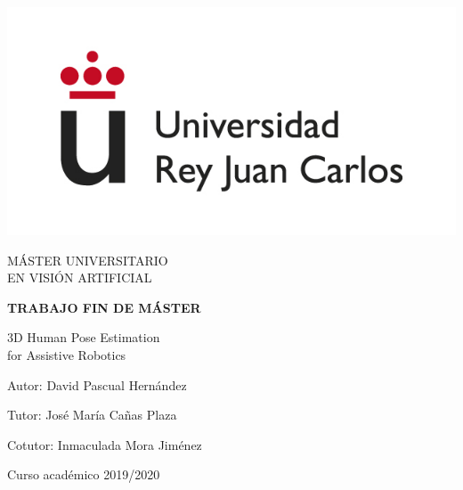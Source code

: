 \begin{titlepage}
	
	\begin{center}
		\vspace*{7.7mm}
		\begin{center}
			\includegraphics[width=0.4\linewidth]{figures/logo.jpg}
		\end{center}
		\vspace{6.5mm}
		
		\fontsize{14}{14}\selectfont MÁSTER UNIVERSITARIO \\ EN VISIÓN ARTIFICIAL

		\vspace{70pt}
		
		\fontsize{15.7}{14}\selectfont \textbf{TRABAJO FIN DE MÁSTER} 
		
		\vspace{25mm}
		\begin{huge}
			 3D Human Pose Estimation \\ for Assistive Robotics
		\end{huge}
		
		\vspace{25mm}
		
		\begin{large}
			Autor: David Pascual Hernández
			
			Tutor: José María Cañas Plaza
			
			Cotutor: Inmaculada Mora Jiménez 
			
			\vspace{10mm}
		\end{large}
		\begin{normalsize}
			Curso académico 2019/2020
		\end{normalsize}
		\vspace{10mm}
		
	\end{center}
	
\end{titlepage}

\pagebreak
\thispagestyle{empty}
\vspace*{12cm}

